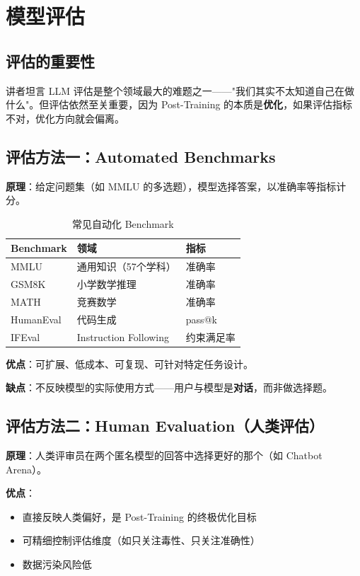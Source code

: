\section{模型评估}

\subsection{评估的重要性}

讲者坦言 LLM 评估是整个领域最大的难题之一——"我们其实不太知道自己在做什么"。但评估依然至关重要，因为 Post-Training 的本质是\textbf{优化}，如果评估指标不对，优化方向就会偏离。

\subsection{评估方法一：Automated Benchmarks}

\textbf{原理}：给定问题集（如 MMLU 的多选题），模型选择答案，以准确率等指标计分。

\begin{table}[H]
\centering
\caption{常见自动化 Benchmark}
\begin{tabular}{lll}
\toprule
\textbf{Benchmark} & \textbf{领域} & \textbf{指标} \\
\midrule
MMLU & 通用知识（57个学科） & 准确率 \\
GSM8K & 小学数学推理 & 准确率 \\
MATH & 竞赛数学 & 准确率 \\
HumanEval & 代码生成 & pass@k \\
IFEval & Instruction Following & 约束满足率 \\
\bottomrule
\end{tabular}
\end{table}

\textbf{优点}：可扩展、低成本、可复现、可针对特定任务设计。

\textbf{缺点}：不反映模型的实际使用方式——用户与模型是\textbf{对话}，而非做选择题。

\subsection{评估方法二：Human Evaluation（人类评估）}

\textbf{原理}：人类评审员在两个匿名模型的回答中选择更好的那个（如 Chatbot Arena）。

\textbf{优点}：
\begin{itemize}
    \item 直接反映人类偏好，是 Post-Training 的终极优化目标
    \item 可精细控制评估维度（如只关注毒性、只关注准确性）
    \item 数据污染风险低
\end{itemize}

